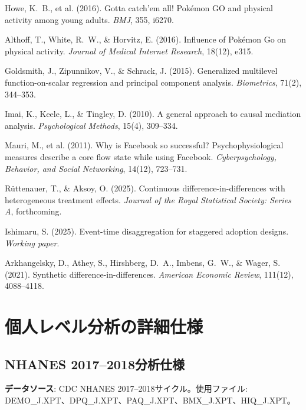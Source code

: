 \documentclass[a4paper,11pt,titlepage]{article}
\begin{document}
\begin{small}
\begin{enumerate}[label={[\arabic*]}, leftmargin=2em, itemsep=2pt]
  \item Howe, K.~B., et al. (2016). Gotta catch'em all! Pok\'emon GO and physical activity among young adults. \textit{BMJ}, 355, i6270.
  \item Althoff, T., White, R.~W., \& Horvitz, E. (2016). Influence of Pok\'emon Go on physical activity. \textit{Journal of Medical Internet Research}, 18(12), e315.
  \item Goldsmith, J., Zipunnikov, V., \& Schrack, J. (2015). Generalized multilevel function-on-scalar regression and principal component analysis. \textit{Biometrics}, 71(2), 344--353.
  \item Imai, K., Keele, L., \& Tingley, D. (2010). A general approach to causal mediation analysis. \textit{Psychological Methods}, 15(4), 309--334.
  \item Mauri, M., et al. (2011). Why is Facebook so successful? Psychophysiological measures describe a core flow state while using Facebook. \textit{Cyberpsychology, Behavior, and Social Networking}, 14(12), 723--731.
  \item R\"{u}ttenauer, T., \& Aksoy, O. (2025). Continuous difference-in-differences with heterogeneous treatment effects. \textit{Journal of the Royal Statistical Society: Series A}, forthcoming.
  \item Ishimaru, S. (2025). Event-time disaggregation for staggered adoption designs. \textit{Working paper}.
  \item Arkhangelsky, D., Athey, S., Hirshberg, D.~A., Imbens, G.~W., \& Wager, S. (2021). Synthetic difference-in-differences. \textit{American Economic Review}, 111(12), 4088--4118.
\end{enumerate}
\end{small}


\appendix
\section{個人レベル分析の詳細仕様}\label{app:specs}

\subsection{NHANES 2017--2018分析仕様}\label{app:nhanes-spec}

\textbf{データソース}: CDC NHANES 2017--2018サイクル。使用ファイル: DEMO\_J.XPT、DPQ\_J.XPT、PAQ\_J.XPT、BMX\_J.XPT、HIQ\_J.XPT。
\end{document}
